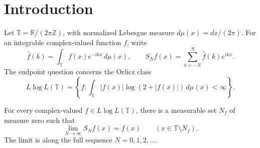 \section{Introduction}\label{sec:introduction}

Let $\mathbb T=\mathbb R/(2\pi\mathbb Z)$, with normalized Lebesgue
measure $d\mu(x)=dx/(2\pi)$. For an integrable complex-valued function
$f$, write
\[
 \widehat f(k)=\int_{\mathbb T} f(x)e^{-ikx}\,d\mu(x),
 \qquad
 S_N f(x)=\sum_{k=-N}^{N}\widehat f(k)e^{ikx}.
\]
The endpoint question concerns the Orlicz class
\[
 L\log L(\mathbb T)
 =\left\{f:\int_{\mathbb T}|f(x)|\log(2+|f(x)|)\,d\mu(x)<\infty\right\}.
\]

\begin{theorem}
\label{thm:main}
For every complex-valued $f\in L\log L(\mathbb T)$, there is a measurable
set $N_f$ of measure zero such that
\[
 \lim_{N\to\infty}S_Nf(x)=f(x)
 \qquad (x\in\mathbb T\setminus N_f).
\]
The limit is along the full sequence $N=0,1,2,\ldots$.
\end{theorem}

